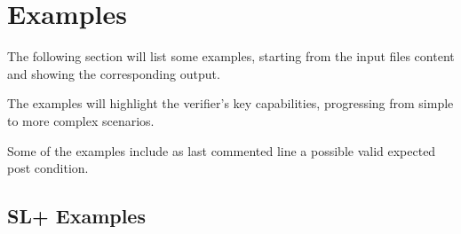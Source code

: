 \documentclass[parskip=half]{scrartcl}
\begin{document}
\section{Examples}

The following section will list some examples, starting from the input files content and showing the corresponding output.

The examples will highlight the verifier's key capabilities, progressing from simple to more complex scenarios.

Some of the examples include as last commented line a possible valid expected post condition.  

\subsection{SL+ Examples}
\end{document}
